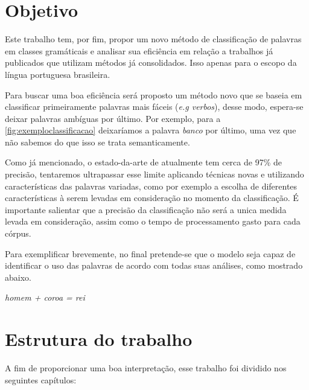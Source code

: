 \section{Objetivo}\label{sec:objetivo}

Este trabalho tem, por fim, propor um novo método de classificação de palavras em classes gramáticais e analisar sua eficiência em relação a trabalhos já publicados que utilizam métodos já consolidados. Isso apenas para o escopo da língua portuguesa brasileira. 

Para buscar uma boa eficiência será proposto um método novo que se baseia em classificar primeiramente palavras mais fáceis (\textit{e.g verbos}), desse modo, espera-se deixar palavras ambíguas por último. Por exemplo, para a \autoref{fig:exemploclassificacao} deixaríamos a palavra \textit{banco} por último, uma vez que não sabemos do que isso se trata semanticamente.  

Como já mencionado, o estado-da-arte de atualmente tem cerca de 97\% de precisão, tentaremos ultrapassar esse limite aplicando técnicas novas e utilizando características das palavras variadas, como por exemplo a escolha de diferentes características à serem levadas em consideração no momento da classificação. É importante salientar que a precisão da classificação não será a unica medida levada em consideração, assim como o tempo de processamento gasto para cada córpus.

Para exemplificar brevemente, no final pretende-se que o modelo seja capaz de identificar o uso das palavras de acordo com todas suas análises, como mostrado abaixo.

\begin{center}
\textit{homem + coroa = rei}
\end{center}



\section{Estrutura do trabalho}\label{sec:estruturadotrabalho}

A fim de proporcionar uma boa interpretação, esse trabalho foi dividido nos
seguintes capítulos:

